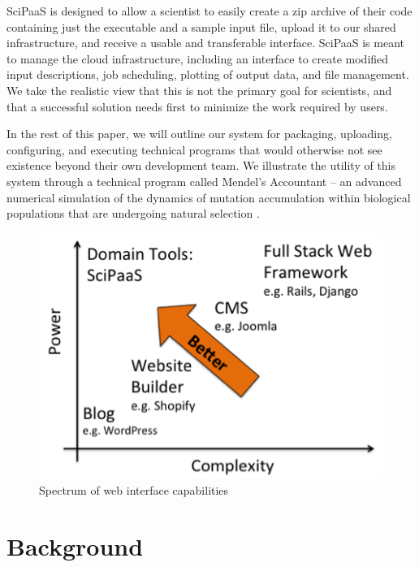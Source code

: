 \documentclass[10pt,reprint]{socc14}
\begin{document}
SciPaaS is designed to allow a scientist to easily create a zip archive of their code containing just the executable and a sample input file, upload it to our shared infrastructure, and receive a usable and transferable interface. SciPaaS is meant to manage the cloud infrastructure, including an interface to create modified input descriptions, job scheduling, plotting of output data, and file management.  We take the realistic view that this is not the primary goal for scientists, and that a successful solution needs first to minimize the work required by users.

In the rest of this paper, we will outline our system for packaging, uploading, configuring, and executing technical programs that would otherwise not see existence beyond their own development team. We illustrate the utility of this system through a technical program called Mendel’s Accountant – an advanced numerical simulation of the dynamics of mutation accumulation within biological populations that are undergoing natural selection \cite{sanford07}.

\begin{figure}[t]
\centering
\includegraphics[natwidth=440,natheight=314]{figs/spectrum.png}
\caption{Spectrum of web interface capabilities \cite{karger14} \label{spectrum}}
\end{figure}

\section{Background}
\end{document}
